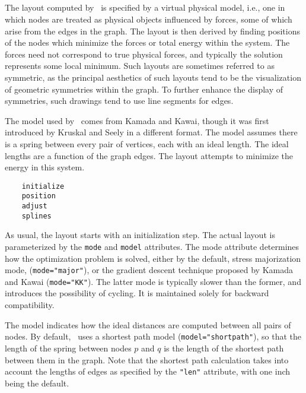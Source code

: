 \subsection{\neato}
\label{sec:neato}

The layout computed by \neato\ is specified by a virtual physical
model, i.e., one in which nodes are treated as physical objects
influenced by forces, some of which arise from the edges in the
graph. The layout is then derived by finding positions of the nodes
which minimize the forces or total energy within the system.
The forces need not correspond to true physical forces, and typically
the solution represents some local minimum. 
Such layouts are sometimes referred to as symmetric, as the
principal aesthetics of such layouts tend to be the visualization
of geometric symmetries within the graph. To further enhance the
display of symmetries, such drawings tend to use line segments for edges.

The model used by \neato\ comes from Kamada and Kawai\cite{kk}, 
though it was first introduced by Kruskal and Seely\cite{kruskal} in a 
different format. 
The model assumes there is a spring between
every pair of vertices, each with an ideal length. The ideal lengths
are a function of the graph edges. The layout attempts to minimize the
energy in this system.

\begin{verbatim}
    initialize
    position
    adjust
    splines
\end{verbatim}

As usual, the layout starts with an initialization step.
The actual layout is parameterized by the {\tt mode} and
{\tt model} attributes.
The mode attribute determines how the optimization problem
is solved, either by the default, stress majorization\cite{gkn} mode,
({\tt mode="major"}),
or the gradient descent technique proposed by Kamada and Kawai\cite{kk}
({\tt mode="KK"}).
The latter mode is typically slower than the former, and introduces the
possibility of cycling. It is maintained solely for backward compatibility.

The model indicates how the ideal distances are computed between all
pairs of nodes.  By default, \neato\
uses a shortest path model ({\tt model="shortpath"}),
so that the length of the spring between
nodes $p$ and $q$ is the length of the shortest path between them
in the graph. Note that the shortest path calculation takes
into account the lengths of edges as specified by the {\tt "len"}
attribute, with one inch being the default. 


